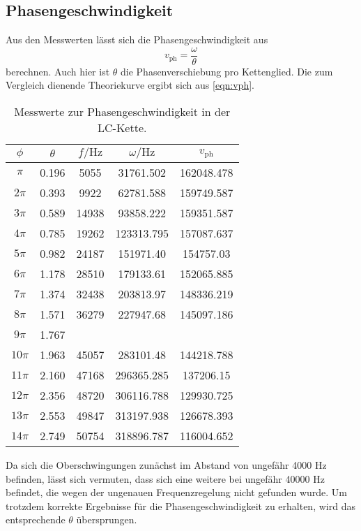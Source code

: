   \subsection{Phasengeschwindigkeit}
  Aus den Messwerten lässt sich die Phasengeschwindigkeit aus
  \begin{equation}
    v_\mathrm{ph} = \frac{\omega}{\theta}
  \end{equation}
  berechnen. Auch hier ist $\theta$ die Phasenverschiebung pro Kettenglied.
  Die zum Vergleich dienende Theoriekurve ergibt sich aus \ref{eqn:vph}.

  \begin{table}
    \centering
    \caption{Messwerte zur Phasengeschwindigkeit in der LC-Kette.}
    \label{tab:v-phase}
    \begin{tabular}{c c c c c}
      \toprule
      $\phi$ & $\theta$ & $f / \si{\hertz}$ & $\omega / \si{\hertz}$ & $v_\mathrm{ph}$ \\
      \midrule
$\pi$ & 0.196 & 5055 & 31761.502 & 162048.478 \\
$2\pi$ & 0.393 &  9922 &  62781.588 & 159749.587 \\
$3\pi$ & 0.589 & 14938 & 93858.222 & 159351.587 \\
$4\pi$ & 0.785 & 19262 & 123313.795 & 157087.637 \\
$5\pi$ & 0.982 & 24187 & 151971.40 & 154757.03 \\
$6\pi$ & 1.178 & 28510 & 179133.61 & 152065.885 \\
$7\pi$ & 1.374 & 32438 & 203813.97 & 148336.219 \\
$8\pi$ &  1.571 & 36279 & 227947.68 & 145097.186 \\
$9\pi$ & 1.767  \\
$10\pi$ & 1.963 & 45057 & 283101.48 & 144218.788 \\
$11\pi$ &  2.160 & 47168 & 296365.285 & 137206.15 \\
$12\pi$ & 2.356 & 48720 & 306116.788 & 129930.725 \\
$13\pi$ & 2.553 & 49847 & 313197.938 & 126678.393 \\
$14\pi$ & 2.749 & 50754 & 318896.787 & 116004.652 \\
\bottomrule
\end{tabular}
\end{table}

Da sich die Oberschwingungen zunächst im Abstand von ungefähr 4000 \si{\Hz} befinden, lässt sich vermuten, dass sich eine weitere bei ungefähr 40000 \si{\Hz} befindet, die wegen der ungenauen Frequenzregelung nicht gefunden wurde.
Um trotzdem korrekte Ergebnisse für die Phasengeschwindigkeit zu erhalten, wird das entsprechende $\theta$ übersprungen.

